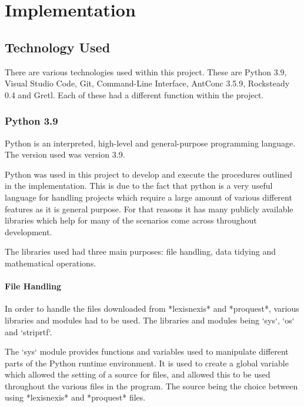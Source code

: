 
\chapter{Implementation}

\section{Technology Used}

There are various technologies used within this project. These are Python 3.9, Visual Studio Code, Git, Command-Line Interface, AntConc 3.5.9, Rocksteady 0.4 and Gretl. Each of these had a different function within the project.

\subsection{Python 3.9}

Python is an interpreted, high-level and general-purpose programming language. The version used was version 3.9. 

Python was used in this project to develop and execute the procedures outlined in the implementation. This is due to the fact that python is a very useful language for handling projects which require a large amount of various different features as it is general purpose. For that reasons it has many publicly available libraries which help for many of the scenarios come across throughout development.

The libraries used had three main purposes: file handling, data tidying and mathematical operations.

\subsubsection{File Handling}

In order to handle the files downloaded from *lexisnexis* and *proquest*, various libraries and modules had to be used. The libraries and modules being `sys`, `os` and `striprtf`.

The `sys` module provides functions and variables used to manipulate different parts of the Python runtime environment. It is used to create a global variable which allowed the setting of a source for files, and allowed this to be used throughout the various files in the program. The source being the choice between using *lexisnexis* and *proquest* files.

